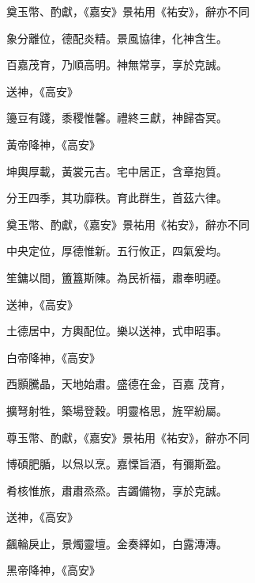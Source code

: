 \begin{pinyinscope}
 奠玉幣、酌獻，《嘉安》景祐用《祐安》，辭亦不同



 象分離位，德配炎精。景風協律，化神含生。



 百嘉茂育，乃順高明。神無常享，享於克誠。



 送神，《高安》



 籩豆有踐，黍稷惟馨。禮終三獻，神歸杳冥。



 黃帝降神，《高安》



 坤輿厚載，黃裳元吉。宅中居正，含章抱質。



 分王四季，其功靡秩。育此群生，首茲六律。



 奠玉幣、酌獻，《嘉安》景祐用《祐安》，辭亦不同



 中央定位，厚德惟新。五行攸正，四氣爰均。



 笙鏞以間，簠簋斯陳。為民祈福，肅奉明禋。



 送神，《高安》



 土德居中，方輿配位。樂以送神，式申昭事。



 白帝降神，《高安》



 西顥騰晶，天地始肅。盛德在金，百嘉
 茂育，



 擴弩射牲，築場登穀。明靈格思，旌罕紛屬。



 尊玉幣、酌獻，《嘉安》景祐用《祐安》，辭亦不同



 博碩肥腯，以炰以烹。嘉慄旨酒，有彌斯盈。



 肴核惟旅，肅肅烝烝。吉蠲備物，享於克誠。



 送神，《高安》



 飆輪戾止，景燭靈壇。金奏繹如，白露漙漙。



 黑帝降神，《高安》




\end{pinyinscope}
